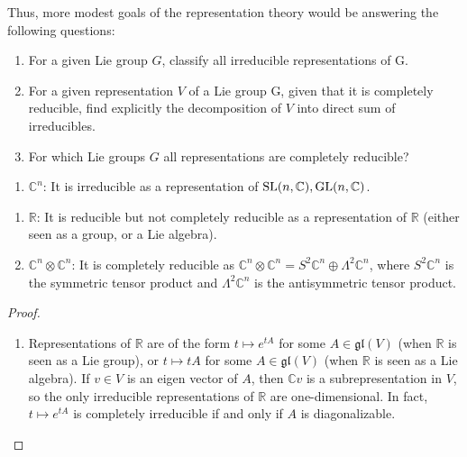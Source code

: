 \documentclass{report}
\begin{document}
Thus, more modest goals of the representation theory would be answering
the following questions:
\begin{enumerate}[label = (\roman*)]
    \item For a given Lie group $G$, classify all irreducible representations of G.
    \item For a given representation $V$ of a Lie group G, given that it is completely reducible, ﬁnd explicitly the decomposition of $V$ into direct sum of irreducibles.
    \item For which Lie groups $G$ all representations are completely reducible?
\end{enumerate}

\begin{example}
    \begin{enumerate}[label = (\roman*)]
        \item $\mathbb C^n$: It is irreducible as a representation of $\operatorname{{\mathrm{SL}}}(n, \mathbb C), \operatorname{{\mathrm{GL}}}(n, \mathbb C)$.
    \end{enumerate}
\end{example}

\begin{example}
    \begin{enumerate}[label = (\roman*)]
        \item $\mathbb R$: It is reducible but not completely reducible as a representation of $\mathbb R$ (either seen as a group, or a Lie algebra).
        \item $\mathbb C^n \otimes \mathbb C^n$: It is completely reducible as $\mathbb C^n \otimes \mathbb C^n = S^2 \mathbb C^n \oplus \Lambda^2 \mathbb C^n$, where $S^2 \mathbb C^n$ is the symmetric tensor product and $\Lambda^2 \mathbb C^n$ is the antisymmetric tensor product.
    \end{enumerate}
\end{example}
\begin{proof}
    \begin{enumerate}[label = (\roman*)]
        \item\label{ex:R_not_completely_irreducible} Representations of $\mathbb R$ are of the form $t \mapsto e^{tA}$ for some $A \in \mathfrak{gl}(V)$ (when $\mathbb R$ is seen as a Lie group), or $t \mapsto tA$ for some $A \in \mathfrak{gl}(V)$ (when $\mathbb R$ is seen as a Lie algebra).
        If $v \in V$ is an eigen vector of $A$, then $\mathbb Cv$ is a subrepresentation in $V$, so the only irreducible representations of $\mathbb R$ are one-dimensional.
        In fact, $t \mapsto e^{tA}$ is completely irreducible if and only if $A$ is diagonalizable.
    \end{enumerate}
\end{proof}
\end{document}
